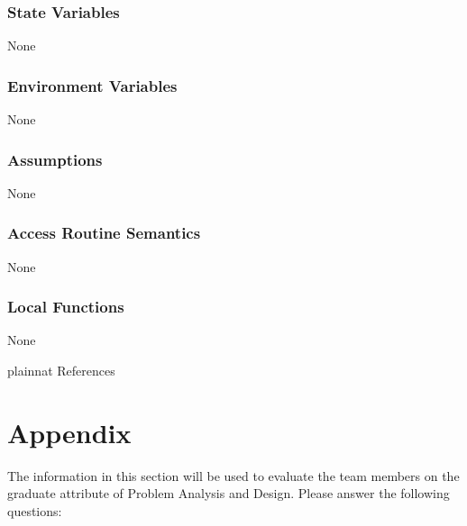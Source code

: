 \documentclass[12pt, titlepage]{article}
\begin{document}
\subsubsection{State Variables}

None

\subsubsection{Environment Variables}

None

\subsubsection{Assumptions}

None

\subsubsection{Access Routine Semantics}

None

\subsubsection{Local Functions}

None

\newpage


 {plainnat}
 {References}

\newpage

\section{Appendix} \label{Appendix}


The information in this section will be used to evaluate the team members on the
graduate attribute of Problem Analysis and Design.  Please answer the following questions:
\end{document}
